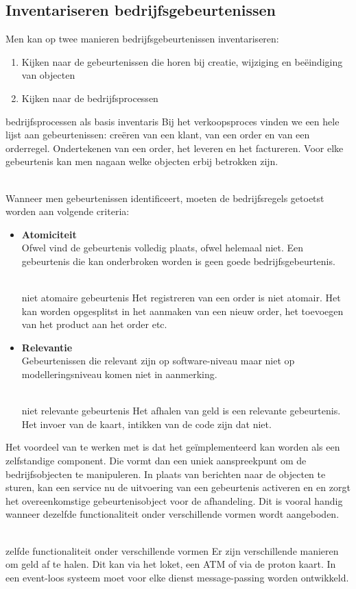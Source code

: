 \documentclass[../../main.tex]{subfiles}
\begin{document}
\subsection{Inventariseren bedrijfsgebeurtenissen}
Men kan op twee manieren bedrijfsgebeurtenissen inventariseren:
\begin{enumerate}
	\item Kijken naar de gebeurtenissen die horen bij creatie, wijziging en be\"eindiging van objecten
	\item Kijken naar de bedrijfsprocessen
\end{enumerate}
\begin{ex}{bedrijfsprocessen als basis inventaris}
Bij het verkoopsproces vinden we een hele lijst aan gebeurtenissen: cre\"eren van een klant, van een order en van een orderregel. Ondertekenen van een order, het leveren en het factureren. Voor elke gebeurtenis kan men nagaan welke objecten erbij betrokken zijn.
\end{ex}
\\
Wanneer men gebeurtenissen identificeert, moeten de bedrijfsregels getoetst worden aan volgende criteria:
\begin{itemize}
	\item \textbf{Atomiciteit} \\
	Ofwel vind de gebeurtenis volledig plaats, ofwel helemaal niet. Een gebeurtenis die kan onderbroken worden is geen goede bedrijfsgebeurtenis. \\\\
	\begin{ex}{niet atomaire gebeurtenis}
	Het registreren van een  order is niet atomair. Het kan worden opgesplitst in het aanmaken van een nieuw order, het toevoegen van het product aan het order etc.
	\end{ex}
	\item \textbf{Relevantie} \\
	Gebeurtenissen die relevant zijn op software-niveau maar niet op modelleringsniveau komen niet in aanmerking.\\\\
	\begin{ex}{niet relevante gebeurtenis}
	Het afhalen van geld is een relevante gebeurtenis. Het invoer van de kaart, intikken van de code zijn dat niet.
	\end{ex}
\end{itemize}
Het voordeel van te werken met  is dat het ge\"implementeerd kan worden als een zelfstandige component. Die vormt dan een uniek aanspreekpunt om de bedrijfsobjecten te manipuleren. In plaats van berichten naar de objecten te sturen, kan een service nu de uitvoering van een gebeurtenis activeren en en zorgt het overeenkomstige gebeurtenisobject voor de afhandeling. Dit is vooral handig wanneer dezelfde functionaliteit onder verschillende vormen wordt aangeboden.\\
\\
\begin{ex}{zelfde functionaliteit onder verschillende vormen}
Er zijn verschillende manieren om geld af te halen. Dit kan via het loket, een ATM of via de proton kaart. In een event-loos systeem moet voor elke dienst message-passing worden ontwikkeld.
\end{ex}
\end{document}
